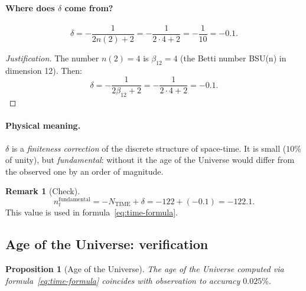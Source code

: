 \documentclass[11pt,a4paper]{article}
\newtheorem{proposition}[theorem]{Proposition}
\theoremstyle{definition}
\newtheorem{remark}[theorem]{Remark}
\begin{document}
\paragraph{Where does $\delta$ come from?}
\begin{equation}
    \boxed{
    \delta = -\frac{1}{2 n(2) + 2} = -\frac{1}{2 \cdot 4 + 2} 
    = -\frac{1}{10} = -0.1.
    }
    \label{eq:delta-formula}
\end{equation}

\begin{proof}[Justification]
The number $n(2) = 4$ is $\beta_{12} = 4$ (the Betti number BSU(n) 
in dimension 12). Then:
\begin{equation}
    \delta = -\frac{1}{2 \beta_{12} + 2} = -\frac{1}{2 \cdot 4 + 2} 
    = -0.1.
\end{equation}
\end{proof}

\paragraph{Physical meaning.}
$\delta$ is a \emph{finiteness correction} of the discrete structure 
of space-time. It is small ($10\%$ of unity), but 
\emph{fundamental}: without it the age of the Universe would differ 
from the observed one by an order of magnitude.

\begin{remark}[Check]
\label{rem:delta-check}
\begin{equation}
    n_t^{\text{fundamental}} = -N_{\text{TIME}} + \delta 
    = -122 + (-0.1) = -122.1.
\end{equation}
This value is used in formula~\eqref{eq:time-formula}.
\end{remark}

\subsection{Age of the Universe: verification}
\label{subsec:time-age}

\begin{proposition}[Age of the Universe]
\label{prop:universe-age}
The age of the Universe computed via formula~\eqref{eq:time-formula} 
coincides with observation to accuracy $\mathbf{0.025\%}$.
\end{proposition}
\end{document}
